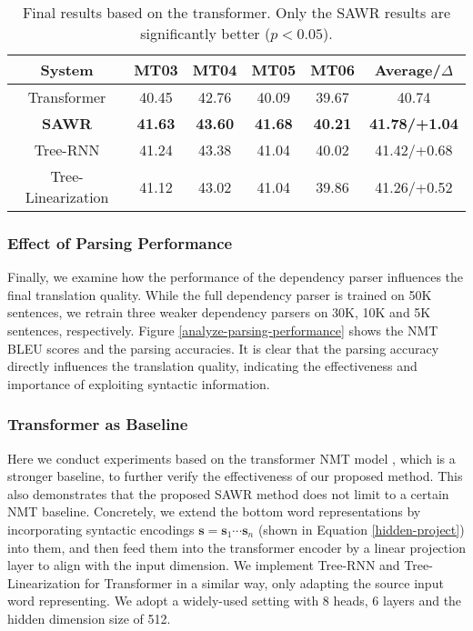 \documentclass[11pt,a4paper]{article}
\begin{document}
\begin{CJK}{UTF8}{gbsn}
\setlength{\tabcolsep}{6pt}
\begin{table*}[ht]
	\begin{center}
\begin{tabular}{c|cccc|c}
				\hline
                System & MT03  & MT04  & MT05  & MT06 & Average/$\Delta$ \\ \hline
				Transformer & 40.45  &   42.76  &  40.09  &  39.67   & 40.74  \\ \hline
                \bf SAWR & \bf 41.63 & \bf 43.60 & \bf 41.68 & \bf 40.21 & \bf 41.78/+1.04   \\ \hline \hline
				Tree-RNN & 41.24 & 43.38 & 41.04 & 40.02 & 41.42/+0.68    \\
                Tree-Linearization & 41.12 & 43.02 & 41.04 & 39.86 & 41.26/+0.52  \\ \hline
			\end{tabular}
			\caption{Final results based on the transformer. Only the SAWR results are significantly better ($p < 0.05$).}
			\label{table:transformer:result}
\end{center}
\end{table*}



\subsubsection{Effect of Parsing Performance}
Finally, we examine how the performance of the dependency parser influences the final translation quality.
While the full dependency parser is trained on 50K sentences,
we retrain three weaker dependency parsers on 30K, 10K and 5K sentences, respectively.
Figure \ref{analyze-parsing-performance} shows the NMT BLEU scores and the parsing accuracies.
It is clear that the parsing accuracy directly influences the translation quality, indicating the effectiveness and importance of exploiting syntactic  information.






\subsubsection{Transformer as Baseline}
Here we conduct experiments based on the transformer NMT model \cite{vaswani2017attention},
which is a stronger baseline, to further verify the effectiveness of our proposed method.
This also demonstrates that the proposed SAWR method does not limit to a certain NMT baseline.
Concretely, we extend the bottom word representations
by incorporating syntactic encodings $\bm{s} \text{$=$} \bm{s}_1 \cdots\bm{s}_n$ (shown
in Equation \ref{hidden-project}) into them,
and then feed them into the transformer encoder by a linear projection layer to align with the input dimension.
We implement Tree-RNN and Tree-Linearization for Transformer in a similar way,
only adapting the source input word representing.
We adopt a widely-used setting with 8 heads, 6 layers and the hidden dimension size of 512.


\end{CJK}
\end{document}
